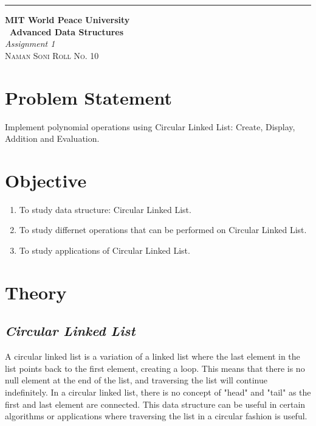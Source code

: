 \documentclass{article}
\begin{document}
\begin{titlepage} %

	\raggedleft\rule{1pt}{\textheight} %
	\hspace{0.05\textwidth} %
	\parbox[b]{0.75\textwidth}
    { %
		
		{\Huge\bfseries MIT World Peace University \\[0.5\baselineskip] \ Advanced Data Structures}\\[2\baselineskip] %
		{\large\textit{Assignment 1}}\\[4\baselineskip] %
		{\Large\textsc{Naman Soni Roll No. 10}} %
		
		\vspace{0.5\textheight} %
	}

\end{titlepage}
\tableofcontents
\pagebreak
\section{\textbf{Problem Statement}}
Implement polynomial operations using Circular Linked List: Create, Display, Addition and Evaluation.
\section{\textbf{Objective}}
\begin{enumerate}
    \item To study data structure: Circular Linked List.
    \item To study differnet operations that can be performed on Circular Linked List.
    \item To study applications of Circular Linked List.
\end{enumerate}
\section{\textbf{Theory}}
\subsection{\textbf{\textit{Circular Linked List}}}
A circular linked list is a variation of a linked list where the last element in the list points back to the first element, creating a loop. This means that there is no null element at the end of the list, and traversing the list will continue indefinitely. In a circular linked list, there is no concept of "head" and "tail" as the first and last element are connected. This data structure can be useful in certain algorithms or applications where traversing the list in a circular fashion is useful.
\end{document}
